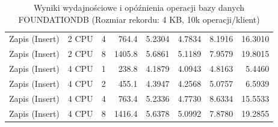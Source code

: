 \begin{table}[ht]
{\begin{tabular}{llcrrrrr}
Zapis (Insert) & 2 CPU & 4 & 764.4 & 5.2304 & 4.7834 & 8.1916 & 16.3010 \\
Zapis (Insert) & 2 CPU & 8 & 1405.8 & 5.6861 & 5.1189 & 7.9579 & 19.8015 \\
Zapis (Insert) & 4 CPU & 1 & 238.8 & 4.1879 & 4.0943 & 4.8163 & 5.4460 \\
Zapis (Insert) & 4 CPU & 2 & 455.1 & 4.3947 & 4.2568 & 5.0757 & 6.5939 \\
Zapis (Insert) & 4 CPU & 4 & 763.4 & 5.2336 & 4.7730 & 8.6334 & 15.5533 \\
Zapis (Insert) & 4 CPU & 8 & 1416.4 & 5.6378 & 5.0992 & 7.8780 & 19.2855 \\
\bottomrule
\end{tabular}%
}
\caption{Wyniki wydajnościowe i opóźnienia operacji bazy danych FOUNDATIONDB (Rozmiar rekordu: 4 KB, 10k operacji/klient)}
\label{tab:latency_foundationdb_medium_10000}
\end{table}
